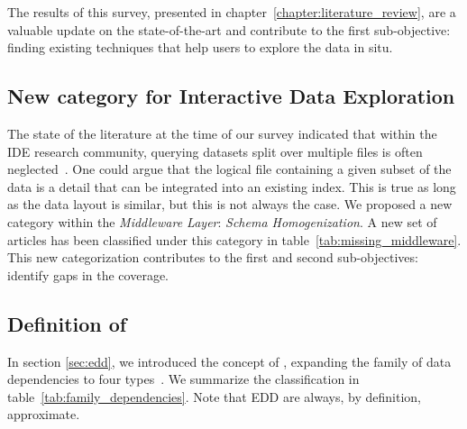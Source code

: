The results of this survey, presented in chapter~\ref{chapter:literature_review}, are a valuable update on
the state-of-the-art and contribute to the first sub-objective: finding existing techniques that help users
to explore the data in situ.

\subsection{New category for Interactive Data Exploration}
The state of the literature at the time of our survey indicated that within the
\gls{IDE} research community, querying datasets split over multiple files is often
neglected~\cite{Silva2016}. One could argue that the logical file containing a given
subset of the data is a detail that can be integrated into an existing index. This is
true as long as the data layout is similar, but this is not always the case.
We proposed a new category within the \emph{Middleware Layer}: \emph{Schema Homogenization}.
A new set of articles has been classified under this category in table~\ref{tab:missing_middleware}.
This new categorization contributes to the first and second sub-objectives: identify gaps in the coverage.

\subsection{Definition of }
In section \ref{sec:edd}, we introduced the concept of , expanding
the family of data dependencies to four types~\cite{abedjan2015}. We
summarize the classification in table~\ref{tab:family_dependencies}.
Note that \gls{EDD} are always, by definition, approximate.

